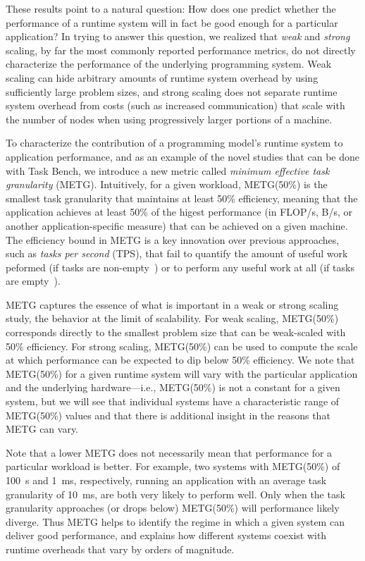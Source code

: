 These results point to a natural question:   How does one predict whether the performance of a runtime
system will in fact be good enough for a particular application?  In trying to answer this question,
we realized that \emph{weak} and \emph{strong} scaling, by far the most commonly
reported performance metrics, do not directly characterize the performance of the underlying
programming system. Weak scaling can hide arbitrary amounts of runtime
system overhead by using sufficiently large problem sizes, and strong
scaling does not separate runtime system overhead from costs
(such as increased communication) that scale with the number of nodes when
using progressively larger portions of a machine. 

To characterize the contribution of a programming model's runtime
system to application performance, and as an example of the novel studies that can be done
with Task Bench, we introduce a new metric called
\emph{minimum effective task granularity} (METG). Intuitively, for a given
workload, METG(50\%) is the smallest task granularity that maintains
at least 50\% efficiency, meaning that the application achieves at
least 50\% of the higest performance (in FLOP/s, B/s, or another
application-specific measure) that can be achieved on a given
machine. The efficiency bound in METG is a key innovation over
previous approaches, such as \emph{tasks per second} (TPS), that fail
to quantify the amount of useful work peformed (if tasks are
non-empty~\cite{Canary16, Armstrong14}) or to perform any useful work at all (if tasks are empty~\cite{LegionTracing18}).

METG captures the essence of what is important in a
weak or strong scaling study, the behavior at the limit of
scalability. For weak scaling, METG(50\%) corresponds directly to the
smallest problem size that can be weak-scaled with 50\%
efficiency. For strong scaling, METG(50\%) can be used to compute the
scale at which performance can be expected to dip below 50\%
efficiency.  We note that METG(50\%) for a given runtime system will
vary with the particular application and the underlying hardware---i.e., METG(50\%)
is not a constant for a given system, but we will see that individual systems have
a characteristic range of METG(50\%) values and that there is additional insight
in the reasons that METG can vary.

Note that a lower METG does not necessarily mean that 
performance for a particular workload is better. For example, two systems with METG(50\%) of 100~\textmu{}s and 1~ms,
respectively, running an application with an average task granularity
of 10~ms, are both very likely to perform well. Only when the task
granularity approaches (or drops below) METG(50\%) will performance
likely diverge. Thus METG helps to identify the regime in which a
given system can deliver good performance, and explains how
different systems coexist with runtime overheads that vary by orders of magnitude.

